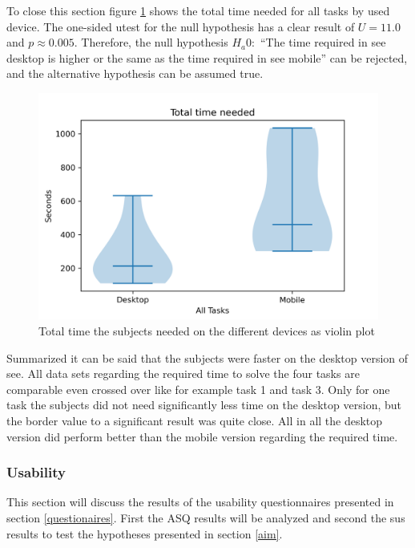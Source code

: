 To close this section figure \ref{fig:device_time_violin} shows the total time needed for all tasks by used device.
The one-sided \gls{utest} for the null hypothesis has a clear result of $U=11.0$ and $p \approx 0.005$.
Therefore, the null hypothesis $H_a0:$ \enquote{The time required in \gls{see} desktop is higher
or the same as the time required in see mobile} can be rejected, and the alternative hypothesis can be assumed true.

\begin{figure}[htb]
  \centering
  \includegraphics*[width=1\textwidth]{Evaluation/img/device_time_violin.png}
  \caption{Total time the subjects needed on the different devices as violin plot}
  \label{fig:device_time_violin}
\end{figure}

Summarized it can be said that the subjects were faster on the desktop version of \gls{see}.
All data sets regarding the required time to solve the four tasks are comparable even crossed over like for example task 1 and task 3. 
Only for one task the subjects did not need significantly less time on the desktop version, but the border value to a significant result was quite close.
All in all the desktop version did perform better than the mobile version regarding the required time.

\subsubsection{Usability}
\label{sec:usability}
This section will discuss the results of the usability questionnaires presented in section \ref{questionaires}.
First the \gls{ASQ} results will be analyzed and second the \gls{sus} results to test the hypotheses presented in section \ref{aim}.
